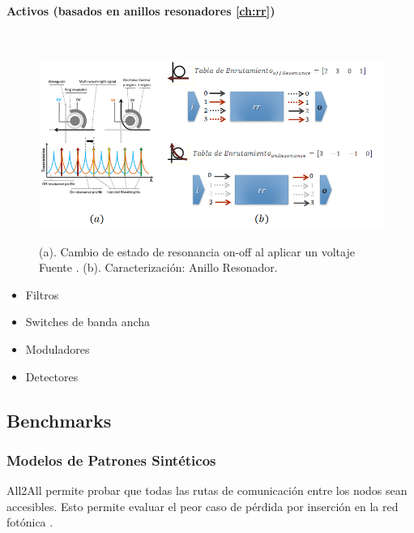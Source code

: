 \paragraph{Activos (basados en anillos resonadores \ref{ch:rr})}~\\
\begin{figure}[H]
\caption{(a). Cambio de estado de resonancia on-off
al aplicar un voltaje Fuente \cite{hendry2011time}. (b). Caracterización: Anillo Resonador.}
\centering
\includegraphics[width=1.0\textwidth,natwidth=800,natheight=390]{figs/rr.png}
\label{fig:phoenix_wgc}
\end{figure}

\begin{itemize}
\item Filtros
\item Switches de banda ancha
\item Moduladores
\item Detectores
\end{itemize}  




\subsection{Benchmarks}
\subsubsection{Modelos de Patrones Sintéticos}
All2All permite probar que todas las rutas de comunicación entre los nodos sean accesibles. Esto permite evaluar el peor caso de pérdida por inserción en la red fotónica \cite{Manual}.


